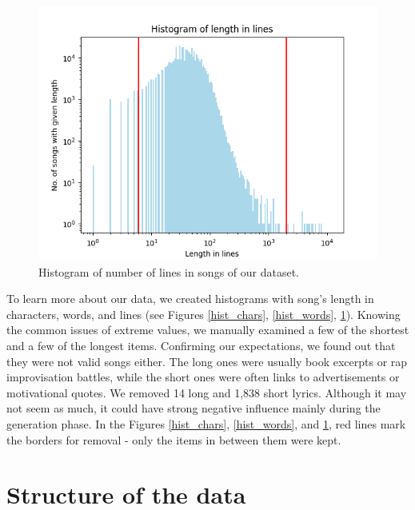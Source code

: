 \begin{figure}[!h]\centering
	\includegraphics[width=\linewidth]{../img/histogram_song_length_in_lines.png}
	\caption{Histogram of number of lines in songs of our dataset.}\label{hist_lines}
	\endminipage\hfill
\end{figure}

To learn more about our data, we created histograms with song's length in characters, words, and lines (see Figures \ref{hist_chars}, \ref{hist_words}, \ref{hist_lines}). Knowing the common issues of extreme values, we manually examined a few of the shortest and a few of the longest items. Confirming our expectations, we found out that they were not valid songs either. The long ones were usually book excerpts or rap improvisation battles, while the short ones were often links to advertisements or motivational quotes. We removed 14 long and 1,838 short lyrics. Although it may not seem as much, it could have strong negative influence mainly during the generation phase. In the Figures \ref{hist_chars}, \ref{hist_words}, and \ref{hist_lines}, red lines mark the borders for removal - only the items in between them were kept.

\section{Structure of the data}

